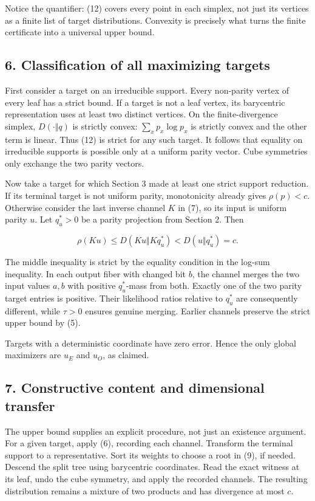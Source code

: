 Notice the quantifier: (12) covers every point in each simplex, not just
its vertices as a finite list of target distributions. Convexity is
precisely what turns the finite certificate into a universal upper
bound.

\subsection{6. Classification of all maximizing
targets}\label{classification-of-all-maximizing-targets}

First consider a target on an irreducible support. Every non-parity
vertex of every leaf has a strict bound. If a target is not a leaf
vertex, its barycentric representation uses at least two distinct
vertices. On the finite-divergence simplex, \(D(\cdot\Vert q)\) is
strictly convex: \(\sum_xp_x\log p_x\) is strictly convex and the other
term is linear. Thus (12) is strict for any such target. It follows that
equality on irreducible supports is possible only at a uniform parity
vector. Cube symmetries only exchange the two parity vectors.

Now take a target for which Section 3 made at least one strict support
reduction. If its terminal target is not uniform parity, monotonicity
already gives \(\rho(p)<c\). Otherwise consider the last inverse channel
\(K\) in (7), so its input is uniform parity \(u\). Let \(q^*_u>0\) be a
parity projection from Section 2. Then

\[
\rho(Ku)\le D(Ku\Vert Kq^*_u)<D(u\Vert q^*_u)=c.
\tag{13}
\]

The middle inequality is strict by the equality condition in the log-sum
inequality. In each output fiber with changed bit \(b\), the channel
merges the two input values \(a,b\) with positive \(q^*_u\)-mass from
both. Exactly one of the two parity target entries is positive. Their
likelihood ratios relative to \(q^*_u\) are consequently different,
while \(\tau>0\) ensures genuine merging. Earlier channels preserve the
strict upper bound by (5).

Targets with a deterministic coordinate have zero error. Hence the only
global maximizers are \(u_E\) and \(u_O\), as claimed.

\subsection{7. Constructive content and dimensional
transfer}\label{constructive-content-and-dimensional-transfer}

The upper bound supplies an explicit procedure, not just an existence
argument. For a given target, apply (6), recording each channel.
Transform the terminal support to a representative. Sort its weights to
choose a root in (9), if needed. Descend the split tree using
barycentric coordinates. Read the exact witness at its leaf, undo the
cube symmetry, and apply the recorded channels. The resulting
distribution remains a mixture of two products and has divergence at
most \(c\).

